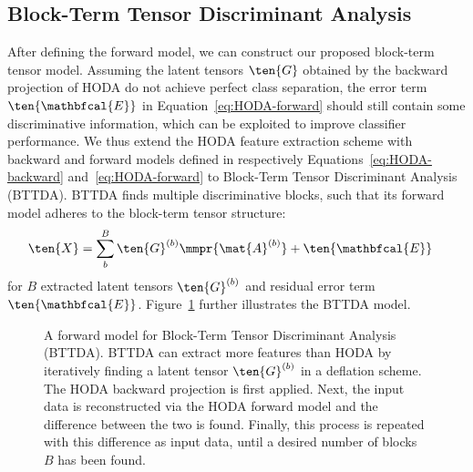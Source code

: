 \subsection{Block-Term Tensor Discriminant Analysis}
After defining the forward model, we can construct our proposed block-term
tensor model.
Assuming the latent tensors $\ten{G}$
obtained by the backward projection of HODA do not achieve perfect
class separation, the error term $\ten{\mathbfcal{E}}$ in
Equation~\ref{eq:HODA-forward} should still contain some discriminative
information, which can be exploited to improve classifier
performance.
We thus extend the HODA feature extraction scheme with backward and
forward models defined in respectively Equations~\ref{eq:HODA-backward}
and~\ref{eq:HODA-forward} to Block-Term Tensor Discriminant Analysis
(BTTDA).
BTTDA finds multiple discriminative blocks, such that its forward
model adheres to the block-term tensor structure:
\begin{align}
	\ten{X} & = \sum_b^B\ten{G}^{(b)}\mmpr{\mat{A}^{(b)}} + \ten{\mathbfcal{E}}
	\label{eq:BTTDA-forward}
\end{align}
for $B$ extracted latent tensors $\ten{G}^{(b)}$ and residual error term
$\ten{\mathbfcal{E}}$.
Figure~\ref{fig:BTTDA} further illustrates the BTTDA model.
\begin{figure}[t]
	\centering
	
	\caption{A forward model for Block-Term Tensor Discriminant Analysis
		(BTTDA). BTTDA can extract more features
		than HODA by iteratively finding a latent tensor $\ten{G}^{(b)}$ in a
		deflation scheme.
		The HODA backward projection is first applied. Next, the
		input data is reconstructed via the HODA forward model and the
		difference between the two is found.
		Finally, this process is repeated with this difference as input data, until a
		desired number of blocks $B$ has been found.}
	\label{fig:BTTDA}
\end{figure}

